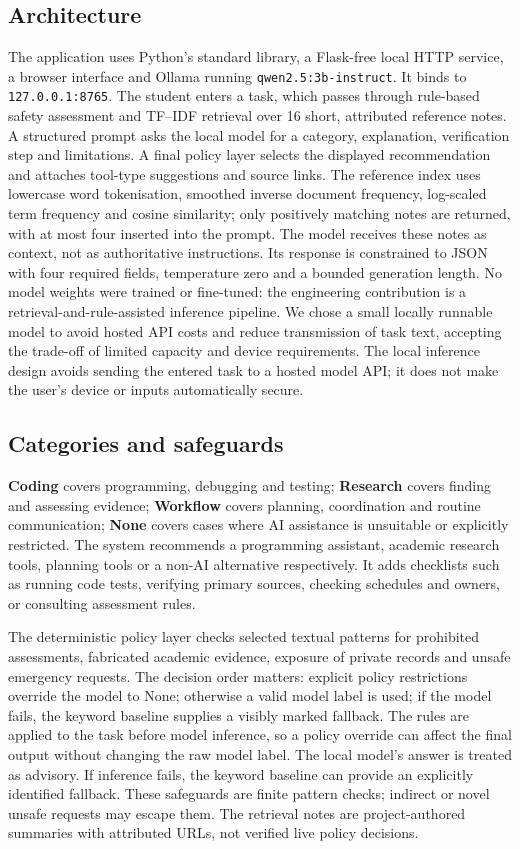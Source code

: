 \documentclass[11pt,a4paper]{article}
\begin{document}
\subsection{Architecture}
The application uses Python's standard library, a Flask-free local HTTP service, a browser interface and Ollama running \texttt{qwen2.5:3b-instruct}. It binds to \texttt{127.0.0.1:8765}. The student enters a task, which passes through rule-based safety assessment and TF--IDF retrieval over 16 short, attributed reference notes. A structured prompt asks the local model for a category, explanation, verification step and limitations. A final policy layer selects the displayed recommendation and attaches tool-type suggestions and source links. The reference index uses lowercase word tokenisation, smoothed inverse document frequency, log-scaled term frequency and cosine similarity; only positively matching notes are returned, with at most four inserted into the prompt. The model receives these notes as context, not as authoritative instructions. Its response is constrained to JSON with four required fields, temperature zero and a bounded generation length. No model weights were trained or fine-tuned: the engineering contribution is a retrieval-and-rule-assisted inference pipeline. We chose a small locally runnable model to avoid hosted API costs and reduce transmission of task text, accepting the trade-off of limited capacity and device requirements. The local inference design avoids sending the entered task to a hosted model API; it does not make the user's device or inputs automatically secure.

\subsection{Categories and safeguards}
\textbf{Coding} covers programming, debugging and testing; \textbf{Research} covers finding and assessing evidence; \textbf{Workflow} covers planning, coordination and routine communication; \textbf{None} covers cases where AI assistance is unsuitable or explicitly restricted. The system recommends a programming assistant, academic research tools, planning tools or a non-AI alternative respectively. It adds checklists such as running code tests, verifying primary sources, checking schedules and owners, or consulting assessment rules.

The deterministic policy layer checks selected textual patterns for prohibited assessments, fabricated academic evidence, exposure of private records and unsafe emergency requests. The decision order matters: explicit policy restrictions override the model to None; otherwise a valid model label is used; if the model fails, the keyword baseline supplies a visibly marked fallback. The rules are applied to the task before model inference, so a policy override can affect the final output without changing the raw model label. The local model's answer is treated as advisory. If inference fails, the keyword baseline can provide an explicitly identified fallback. These safeguards are finite pattern checks; indirect or novel unsafe requests may escape them. The retrieval notes are project-authored summaries with attributed URLs, not verified live policy decisions.
\end{document}
